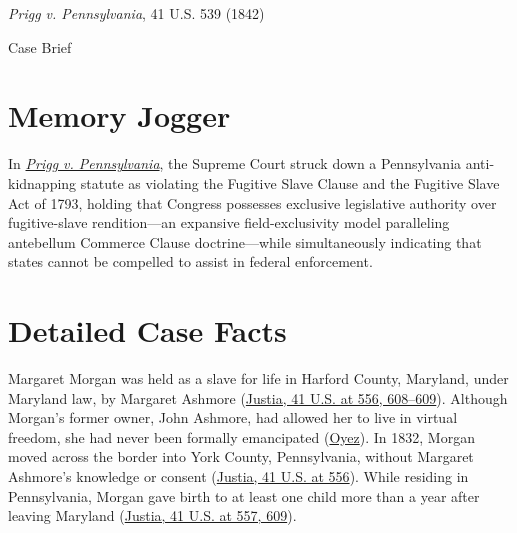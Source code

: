 \documentclass[12pt]{article}
\begin{document}
\begin{center}
{\LARGE \textit{Prigg v. Pennsylvania}, 41 U.S. 539 (1842)\par}
\vspace{0.8em}
{\large Case Brief\par}
\end{center}
\vspace{1em}

\section{Memory Jogger}
In \href{https://www.courtlistener.com/opinion/86231/prigg-v-pennsylvania/}{\textit{Prigg v. Pennsylvania}}, the Supreme Court struck down a Pennsylvania anti-kidnapping statute as violating the Fugitive Slave Clause and the Fugitive Slave Act of 1793, holding that Congress possesses exclusive legislative authority over fugitive-slave rendition---an expansive field-exclusivity model paralleling antebellum Commerce Clause doctrine---while simultaneously indicating that states cannot be compelled to assist in federal enforcement.

\section{Detailed Case Facts}
Margaret Morgan was held as a slave for life in Harford County, Maryland, under Maryland law, by Margaret Ashmore (\href{https://supreme.justia.com/cases/federal/us/41/539/}{Justia, 41 U.S. at 556, 608--609}). Although Morgan's former owner, John Ashmore, had allowed her to live in virtual freedom, she had never been formally emancipated (\href{https://www.oyez.org/cases/1789-1850/41us539}{Oyez}). In 1832, Morgan moved across the border into York County, Pennsylvania, without Margaret Ashmore's knowledge or consent (\href{https://supreme.justia.com/cases/federal/us/41/539/}{Justia, 41 U.S. at 556}). While residing in Pennsylvania, Morgan gave birth to at least one child more than a year after leaving Maryland (\href{https://supreme.justia.com/cases/federal/us/41/539/}{Justia, 41 U.S. at 557, 609}).
\end{document}
